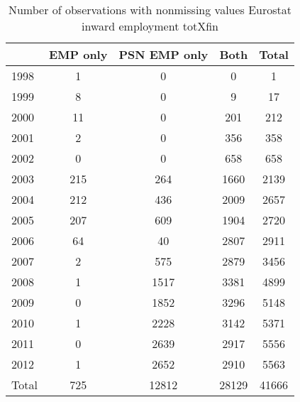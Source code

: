 \begin{table}[htbp]\centering
\caption{Number of observations with nonmissing values Eurostat inward employment totXfin}
\begin{tabular}{l*{4}{c}}
\toprule
            &    EMP only&PSN EMP only&        Both&       Total\\
\midrule
1998        &           1&           0&           0&           1\\
1999        &           8&           0&           9&          17\\
2000        &          11&           0&         201&         212\\
2001        &           2&           0&         356&         358\\
2002        &           0&           0&         658&         658\\
2003        &         215&         264&        1660&        2139\\
2004        &         212&         436&        2009&        2657\\
2005        &         207&         609&        1904&        2720\\
2006        &          64&          40&        2807&        2911\\
2007        &           2&         575&        2879&        3456\\
2008        &           1&        1517&        3381&        4899\\
2009        &           0&        1852&        3296&        5148\\
2010        &           1&        2228&        3142&        5371\\
2011        &           0&        2639&        2917&        5556\\
2012        &           1&        2652&        2910&        5563\\
Total       &         725&       12812&       28129&       41666\\
\bottomrule
\end{tabular}
\end{table}
